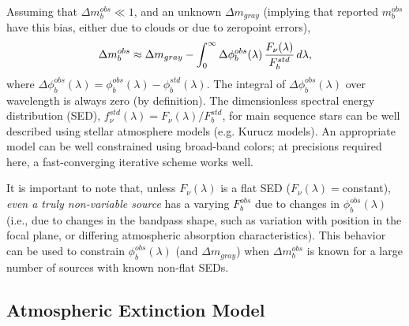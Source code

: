 \documentclass[12pt,preprint]{aastex}
\begin{document}
Assuming that $\Delta m_b^{obs} \ll 1$, and an unknown $\Delta m_{gray}$ (implying that reported
$m_b^{obs}$ have this bias, either due to clouds or due to zeropoint errors), 
\begin{equation}
  \Delta m_b^{obs}   \approx \Delta m_{gray} - \int_0^\infty { \Delta\phi_b^{obs}(\lambda) \,  {F_\nu(\lambda) \over F_b^{std}} \, d\lambda},
\end{equation}
where $\Delta\phi_b^{obs}(\lambda) = \phi_b^{obs}(\lambda) - \phi_b^{std}(\lambda)$. The integral of 
$\Delta\phi_b^{obs}(\lambda)$ over wavelength is always zero (by definition).  The dimensionless 
spectral energy distribution (SED), $f_\nu^{std}(\lambda) = F_\nu(\lambda) /F_b^{std}$, for main sequence
stars can be well described using stellar atmosphere models (e.g. Kurucz models). An appropriate
model can be well constrained using broad-band colors; at precisions required here, a fast-converging
iterative scheme works well. 

It is important to note that, unless $F_\nu(\lambda)$ is a flat SED ($F_\nu(\lambda)=$constant), {\it even a truly non-variable source}
has a varying $F_b^{obs}$ due to changes in $\phi_b^{obs}(\lambda)$ (i.e., due to changes in the bandpass 
shape, such as variation with position in the focal plane, or differing atmospheric absorption characteristics).
This behavior can be used to constrain
$\phi_b^{obs}(\lambda)$ (and $\Delta m_{gray}$) when $\Delta m_b^{obs}$ is known for a large number of 
sources with known non-flat SEDs. 



\subsection{Atmospheric Extinction Model} 
\end{document}
